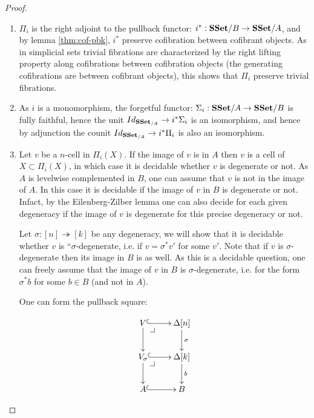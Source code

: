 \documentclass[reqno,10pt,a4paper,oneside,draft]{amsart}
\begin{document}
\begin{proof}

\begin{enumerate}

\item $\Pi_i$ is the right adjoint to the pullback functor: $i^*:\mathbf{SSet}/B \rightarrow \mathbf{SSet}/A$, and by lemma \ref{thm:cof-pbk}, $i^*$ preserve cofibration between cofibrant objects. As in simplicial sets trivial fibrations are characterized by the right lifting property along cofibrations between cofibration objects (the generating cofibrations are between cofibrant objects), this shows that $\Pi_i$ preserve trivial fibrations.

\item As $i$ is a monomorphism, the forgetful functor: $\Sigma_i : \mathbf{SSet}/A \rightarrow \mathbf{SSet}/B$ is fully faithful, hence the unit $Id_{\mathbf{SSet}_{/A}} \rightarrow i^* \Sigma_i$ is an isomorphism, and hence by adjunction the counit $Id_{\mathbf{SSet}_{/A}} \rightarrow i^* \Pi_i$ is also an isomorphism.

\item Let $v$ be a $n$-cell in $\Pi_i(X)$.
If the image of $v$ is in $A$ then $v$ is a cell of $X \subset \Pi_i(X)$, in which case it is decidable whether $v$ is degenerate or not.
As $A$ is levelwise complemented in $B$, one can assume that $v$ is not in the image of $A$. In this case it is decidable if the image of $v$ in $B$ is degenerate or not.
Infact, by the Eilenberg-Zilber lemma one can also decide for each given degeneracy if the image of $v$ is degenerate for this precise degeneracy or not. 

Let $\sigma:[n] \twoheadrightarrow [k]$ be any degeneracy, we will show that it is decidable whether $v$ is ``$\sigma$-degenerate, i.e. if $v =\sigma^* v'$ for some $v'$. Note that if $v$ is $\sigma$-degenerate then its image in $B$ is as well. As this is a decidable question, one can freely assume that the image of $v$ in $B$ is $\sigma$-degenerate, i.e. for the form $\sigma^* b$ for some $b \in B$ (and not in $A$).

 One can form the pullback square:


\[
\xymatrix{
V \ar@{^{(}->}[r] \drpullback \ar[d] & \Delta[n] \ar@{->}[d]^{\sigma} \\
V_{\sigma} \ar@{^{(}->}[r] \drpullback \ar[d] & \Delta[k] \ar@{->}[d]^b \\
A \ar@{^{(}->}[r] &  B }
\]


\end{enumerate}
\end{proof}
\end{document}
